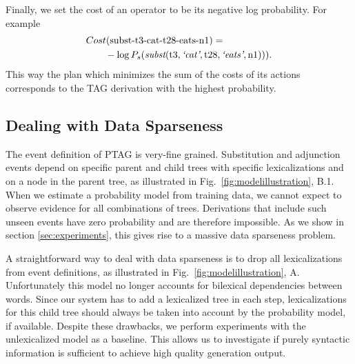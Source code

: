 Finally, we set the cost of an operator to be its negative log probability. For example 
\begin{align*}
&Cost(\mbox{subst-t3-cat-t28-eats-n1}) = \\
 & \qquad -\log P_s(\textit{subst}(\mathrm{t3},\textit{`cat'},\mathrm{t28},\textit{`eats'},\mathrm{n1})) ).
\end{align*}
This way the plan which minimizes the sum of the costs of its actions  corresponds to the TAG derivation with the highest probability. 

\subsection{Dealing with Data Sparseness}
\label{ssec:sparseness}
The event definition of PTAG is very-fine grained. Substitution and adjunction events depend on specific parent and child trees with specific lexicalizations and on a node in the parent tree, as illustrated in Fig.~\ref{fig:modelillustration}, B.1. When we estimate a probability model from training data, we cannot expect to observe evidence for all combinations of trees. Derivations that include such unseen events have zero probability and are therefore impossible. As we show in section \ref{sec:experiments}, this gives rise to a massive data sparseness problem.

  A straightforward way to deal with data sparseness is to drop all lexicalizations from event definitions, as illustrated in Fig.~\ref{fig:modelillustration}, A. Unfortunately this model  no longer accounts for bilexical dependencies between words. Since our system has to add a lexicalized tree in each step, lexicalizations for this child tree should always be taken into account by the probability model, if available. Despite these drawbacks, we perform experiments with the unlexicalized model as a baseline. This allows us to investigate if purely syntactic information is sufficient to achieve high quality generation output.

